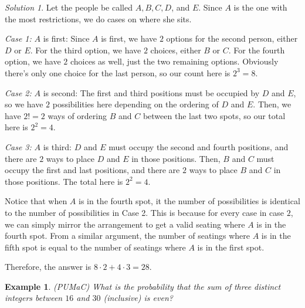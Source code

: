 \documentclass[letterpaper]{article}
\newtheorem{example}[thm]{Example}
\theoremstyle{remark}
\newtheorem*{solution}{Solution}
\theoremstyle{definition}
\begin{document}
\begin{solution}
Let the people be called $A, B, C, D$, and $E$. Since $A$ is the one with the most restrictions, we do cases on where she sits. 
\newline

\textit{Case 1:} $A$ is first: Since $A$ is first, we have $2$ options for the second person, either $D$ or $E$. For the third option, we have $2$ choices, either $B$ or $C$. For the fourth option, we have $2$ choices as well, just the two remaining options. Obviously there's only one choice for the last person, so our count here is $2^3=8$.
\newline

\textit{Case 2:} $A$ is second: The first and third positions must be occupied by $D$ and $E$, so we have $2$ possibilities here depending on the ordering of $D$ and $E$. Then, we have $2!=2$ ways of ordering $B$ and $C$ between the last two spots, so our total here is $2^2=4$.
\newline

\textit{Case 3:} $A$ is third: $D$ and $E$ must occupy the second and fourth positions, and there are $2$ ways to place $D$ and $E$ in those positions. Then, $B$ and $C$ must occupy the first and last positions, and there are $2$ ways to place $B$ and $C$ in those positions. The total here is $2^2=4$.
\newline

Notice that when $A$ is in the fourth spot, it the number of possibilities is identical to the number of possibilities in Case 2. This is because for every case in case $2$, we can simply mirror the arrangement to get a valid seating where $A$ is in the fourth spot. From a similar argument, the number of seatings where $A$ is in the fifth spot is equal to the number of seatings where $A$ is in the first spot.


Therefore, the answer is $8\cdot 2+4\cdot 3=28$.
\end{solution}

\begin{example}
(PUMaC) What is the probability that the sum of three distinct integers between $16$ and $30$ (inclusive) is even?
\end{example}
\end{document}
